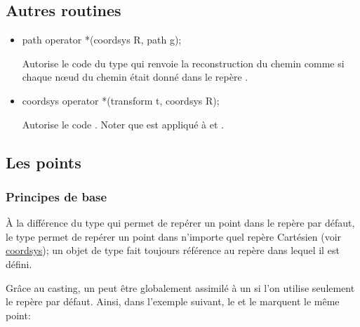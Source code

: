 \documentclass[pdftex]{article}
\begin{document}
\subsection{Autres routines}
\begin{itemize}
\item {}
    \begin{Vcolor}
    path operator *(coordsys R, path g);
  \end{Vcolor}
  Autorise le code du type  qui
  renvoie la reconstruction du chemin  comme si chaque n\oe{}ud du
  chemin était donné dans le repère .
\item {}
    \begin{Vcolor}
    coordsys operator *(transform t, coordsys R);
  \end{Vcolor}
  Autorise le code . Noter que
   est appliqué à  et .
\end{itemize}

\subsection{Les points}
\subsubsection{Principes de base}
À la différence du type  qui permet de
repérer un point dans le repère par défaut, le type 
permet de repérer un point dans n'importe quel repère Cartésien (voir
\href{#section.coordsys}{coordsys}); un objet de type
 fait toujours référence au repère dans lequel il est défini.

Grâce au \og{}casting\fg{}, un  peut être globalement assimilé à
un  si l'on utilise seulement le repère par
défaut. Ainsi, dans l'exemple suivant, le  et le
 marquent le même point:
\end{document}
